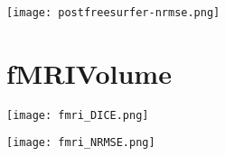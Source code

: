 \begin{center}
  \texttt{[image: postfreesurfer-nrmse.png]}
   \label{fig:Postfreesurfer_NRMSE}
\end{center}

\section{fMRIVolume}\label{sec:fMRI}
\begin{center}
  \texttt{[image: fmri\_DICE.png]}
   \label{fig:fMRI_Dice}
\end{center}

\begin{center}
  \texttt{[image: fmri\_NRMSE.png]}
   \label{fig:fMRI_NRMSE}
\end{center}
